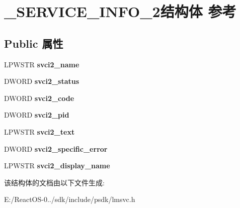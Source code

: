 \hypertarget{struct___s_e_r_v_i_c_e___i_n_f_o__2}{}\section{\+\_\+\+S\+E\+R\+V\+I\+C\+E\+\_\+\+I\+N\+F\+O\+\_\+2结构体 参考}
\label{struct___s_e_r_v_i_c_e___i_n_f_o__2}
\subsection*{Public 属性}
\begin{DoxyCompactItemize}
\item 
\mbox{\label{struct___s_e_r_v_i_c_e___i_n_f_o__2_a2ef5973fe25cdbc7dc1c9e2447cf1ff8}} 
L\+P\+W\+S\+TR {\bfseries svci2\+\_\+name}
\item 
\mbox{\label{struct___s_e_r_v_i_c_e___i_n_f_o__2_a0234c5a69945a1e362347b3fe33e901e}} 
D\+W\+O\+RD {\bfseries svci2\+\_\+status}
\item 
\mbox{\label{struct___s_e_r_v_i_c_e___i_n_f_o__2_aba6cf1912d1dbae2811df6b1c0e9c4ed}} 
D\+W\+O\+RD {\bfseries svci2\+\_\+code}
\item 
\mbox{\label{struct___s_e_r_v_i_c_e___i_n_f_o__2_adc02305754779232ce77f3fea36dc87e}} 
D\+W\+O\+RD {\bfseries svci2\+\_\+pid}
\item 
\mbox{\label{struct___s_e_r_v_i_c_e___i_n_f_o__2_a4bf5bde568a6d64fa3878bbcee81435b}} 
L\+P\+W\+S\+TR {\bfseries svci2\+\_\+text}
\item 
\mbox{\label{struct___s_e_r_v_i_c_e___i_n_f_o__2_a94e6da4da8bcbe6c5c1ab9c217f830a6}} 
D\+W\+O\+RD {\bfseries svci2\+\_\+specific\+\_\+error}
\item 
\mbox{\label{struct___s_e_r_v_i_c_e___i_n_f_o__2_ab24f15905cd76d5937f4d6d3283c06f5}} 
L\+P\+W\+S\+TR {\bfseries svci2\+\_\+display\+\_\+name}
\end{DoxyCompactItemize}


该结构体的文档由以下文件生成\+:\begin{DoxyCompactItemize}
\item 
E\+:/\+React\+O\+S-\/0../sdk/include/psdk/lmsvc.\+h\end{DoxyCompactItemize}
